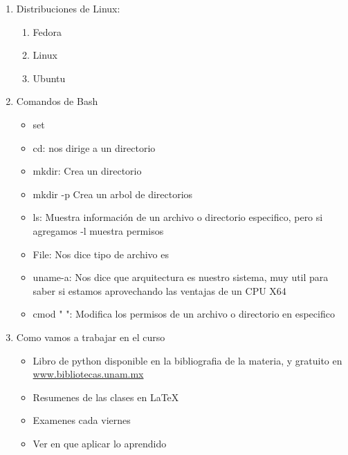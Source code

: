 \documentclass{book}
\begin{document}
\begin{enumerate}%
	\item Distribuciones de Linux: %
	\begin{enumerate}%
		\item Fedora
		\item Linux
		\item Ubuntu
	\end{enumerate}%
	\item Comandos de Bash%
	\begin{itemize}%
		\item set
		\item cd: nos dirige a un directorio
		\item mkdir: Crea un directorio
		\item mkdir -p Crea un arbol de directorios
		\item ls: Muestra información de un archivo o directorio especifico, pero si agregamos -l muestra permisos
		\item File: Nos dice tipo de archivo es
		\item uname-a: Nos dice que arquitectura es nuestro sistema, muy util para saber si estamos aprovechando las ventajas de un CPU X64
		\item cmod "   ": Modifica los permisos de un archivo o directorio en especifico
		
	\end{itemize}%
	\item Como vamos a trabajar en el curso
	\begin{itemize}
		\item Libro de python disponible en la bibliografia de la materia, y gratuito en \url{www.bibliotecas.unam.mx}
		\item Resumenes de las clases en LaTeX
		\item Examenes cada viernes
		\item Ver en que aplicar lo aprendido
	\end{itemize}
	
	
	
	
\end{enumerate}%
\end{document}
